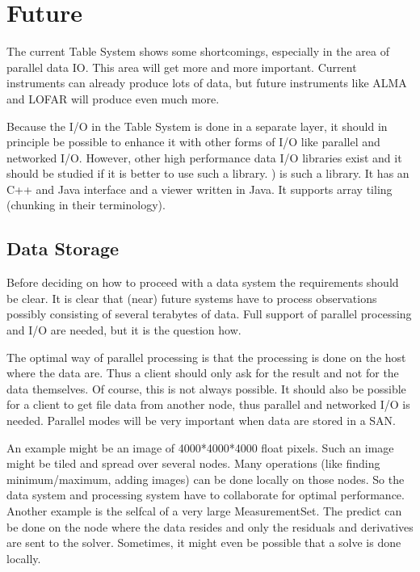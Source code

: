 \section{Future}
The current Table System shows some shortcomings, especially in the
area of parallel data IO. This area will get more and more important.
Current instruments can already produce lots of data, but future
instruments like ALMA and LOFAR will produce even much more.

Because the I/O in the Table System is done in a separate layer, it
should in principle be possible to enhance it with other forms of
I/O like parallel and networked I/O. However, other high
performance data I/O libraries
exist and it should be studied if it is better to use such a library.
) is such a
library. It has an C++ and Java interface and a viewer written in
Java. It supports array tiling (chunking in their terminology).

\subsection{Data Storage}
Before deciding on how to proceed with a data system the requirements 
should be clear.
It is clear that (near) future systems have to process observations
possibly consisting of several terabytes of data. Full support of
parallel processing and I/O are needed, but it is the question how.

The optimal way of parallel processing is that the processing is done
on the host where the data are. Thus a client should only ask for the
result and not for the data themselves. Of course, this is not always
possible. It should also be possible for a client to get file data
from another node, thus parallel and networked I/O is needed.
Parallel modes will be very important when data are stored in a SAN.

An example might be an image of 4000*4000*4000 float pixels.
Such an image might be tiled and spread over several nodes.
Many operations (like finding minimum/maximum, adding images) can be
done locally on those nodes. So the data system and processing system
have to collaborate for optimal performance.
\\Another example is the selfcal of a very large MeasurementSet. The
predict can be done on the node where the data resides and only the
residuals and derivatives are sent to the solver. Sometimes, it might
even be possible that a solve is done locally.

